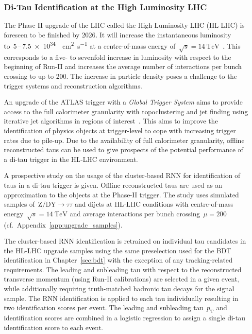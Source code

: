 \subsubsection{Di-Tau Identification at the High Luminosity LHC}
\label{sec:hlt_rate_reduction}

The Phase-II upgrade of the LHC called the High Luminosity LHC (HL-LHC) is
foreseen to be finished by 2026. It will increase the instantaneous luminosity
to~\num{5}\,--\,\SI{7.5e34}{\per\square\centi\metre\per\second} at a
centre-of-mass energy
of~$\sqrt{s} = \SI{14}{\TeV}$~\cite{hl_lhc_prelim_design_report}. This
corresponds to a five- to sevenfold increase in luminosity with respect to the
beginning of Run-II and increases the average number of interactions per bunch
crossing to up to \num{200}. The increase in particle density poses a challenge
to the trigger systems and reconstruction algorithms.

An upgrade of the ATLAS trigger with a \emph{Global Trigger System} aims to
provide access to the full calorimeter granularity with topoclustering and jet
finding using iterative jet algorithms in regions of
interest~\cite{phase_2_scoping}. This aims to improve the identification of
physics objects at trigger-level to cope with increasing trigger rates due to
pile-up. Due to the availability of full calorimeter granularity, offline
reconstructed taus can be used to give prospects of the potential performance of
a di-tau trigger in the HL-LHC environment.

A prospective study on the usage of the cluster-based RNN for identification of
taus in a di-tau trigger is given. Offline reconstructed taus are used as an
approximation to the objects at the Phase-II trigger. The study uses simulated
samples of~$\text{Z} / \text{DY} \to \tau \tau$ and dijets at HL-LHC conditions
with centre-of-mass energy~$\sqrt{s}=\SI{14}{\TeV}$ and average interactions per
bunch crossing~$\mu = 200$ (cf.\ Appendix~\ref{app:upgrade_samples}).

The cluster-based RNN identification is retrained on individual tau candidates
in the HL-LHC upgrade samples using the same preselection used for the BDT
identification in Chapter~\ref{sec:bdt} with the exception of any
tracking-related requirements. The leading and subleading tau with respect to
the reconstructed transverse momentum (using Run-II calibrations) are selected
in a given event, while additionally requiring truth-matched hadronic tau decays
for the signal sample. The RNN identification is applied to each tau
individually resulting in two identification scores per event. The leading and
subleading tau~$p_\text{T}$ and identification scores are combined in a logistic
regression to assign a single di-tau identification score to each event.

